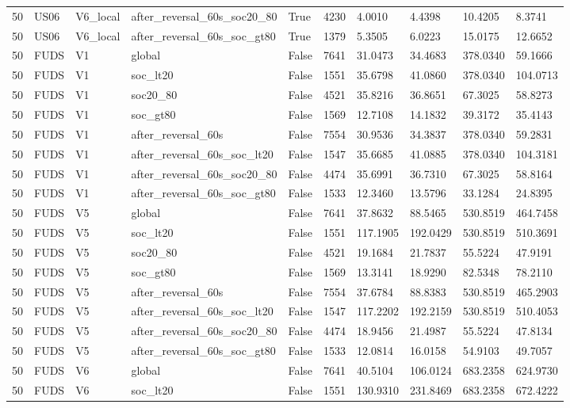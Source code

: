 \begin{tabular}{llllllllll}
50 & US06 & V6\_local & after\_reversal\_60s\_soc20\_80 & True & 4230 & 4.0010 & 4.4398 & 10.4205 & 8.3741 \\
50 & US06 & V6\_local & after\_reversal\_60s\_soc\_gt80 & True & 1379 & 5.3505 & 6.0223 & 15.0175 & 12.6652 \\
50 & FUDS & V1 & global & False & 7641 & 31.0473 & 34.4683 & 378.0340 & 59.1666 \\
50 & FUDS & V1 & soc\_lt20 & False & 1551 & 35.6798 & 41.0860 & 378.0340 & 104.0713 \\
50 & FUDS & V1 & soc20\_80 & False & 4521 & 35.8216 & 36.8651 & 67.3025 & 58.8273 \\
50 & FUDS & V1 & soc\_gt80 & False & 1569 & 12.7108 & 14.1832 & 39.3172 & 35.4143 \\
50 & FUDS & V1 & after\_reversal\_60s & False & 7554 & 30.9536 & 34.3837 & 378.0340 & 59.2831 \\
50 & FUDS & V1 & after\_reversal\_60s\_soc\_lt20 & False & 1547 & 35.6685 & 41.0885 & 378.0340 & 104.3181 \\
50 & FUDS & V1 & after\_reversal\_60s\_soc20\_80 & False & 4474 & 35.6991 & 36.7310 & 67.3025 & 58.8164 \\
50 & FUDS & V1 & after\_reversal\_60s\_soc\_gt80 & False & 1533 & 12.3460 & 13.5796 & 33.1284 & 24.8395 \\
50 & FUDS & V5 & global & False & 7641 & 37.8632 & 88.5465 & 530.8519 & 464.7458 \\
50 & FUDS & V5 & soc\_lt20 & False & 1551 & 117.1905 & 192.0429 & 530.8519 & 510.3691 \\
50 & FUDS & V5 & soc20\_80 & False & 4521 & 19.1684 & 21.7837 & 55.5224 & 47.9191 \\
50 & FUDS & V5 & soc\_gt80 & False & 1569 & 13.3141 & 18.9290 & 82.5348 & 78.2110 \\
50 & FUDS & V5 & after\_reversal\_60s & False & 7554 & 37.6784 & 88.8383 & 530.8519 & 465.2903 \\
50 & FUDS & V5 & after\_reversal\_60s\_soc\_lt20 & False & 1547 & 117.2202 & 192.2159 & 530.8519 & 510.4053 \\
50 & FUDS & V5 & after\_reversal\_60s\_soc20\_80 & False & 4474 & 18.9456 & 21.4987 & 55.5224 & 47.8134 \\
50 & FUDS & V5 & after\_reversal\_60s\_soc\_gt80 & False & 1533 & 12.0814 & 16.0158 & 54.9103 & 49.7057 \\
50 & FUDS & V6 & global & False & 7641 & 40.5104 & 106.0124 & 683.2358 & 624.9730 \\
50 & FUDS & V6 & soc\_lt20 & False & 1551 & 130.9310 & 231.8469 & 683.2358 & 672.4222 \\

\end{tabular}
